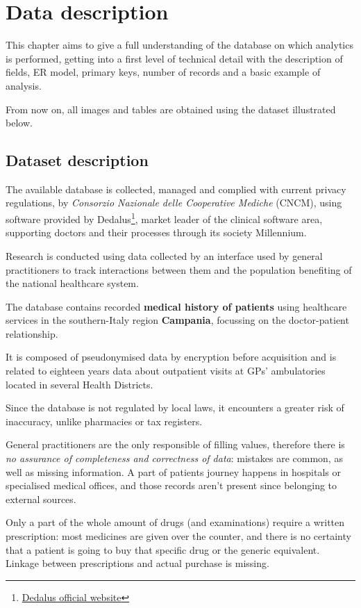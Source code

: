 \chapter{Data description}
This chapter aims to give a full understanding of the database on which analytics is performed, getting into a first level of technical detail with the description of fields, ER model, primary keys, number of records and a basic example of analysis.

From now on, all images and tables are obtained using the dataset illustrated below.

\section{Dataset description}
The available database is collected, managed and complied with current privacy regulations, by \textit{Consorzio Nazionale delle Cooperative Mediche} (CNCM), using software provided by Dedalus\footnote{\href{https://www.dedalus.eu/}{Dedalus official website}}, market leader of the clinical software area, supporting doctors and their processes through its society Millennium. 

Research is conducted using data collected by an interface used by general practitioners to track interactions between them and the population benefiting of the national healthcare system.

The database contains recorded \textbf{medical history of patients} using healthcare services in the southern-Italy region \textbf{Campania}, focussing on the doctor-patient relationship.

It is composed of pseudonymised data by encryption before acquisition and is related to eighteen years data about outpatient visits at GPs’ ambulatories located in several Health Districts.

Since the database is not regulated by local laws, it encounters a greater risk of inaccuracy, unlike pharmacies or tax registers. 

General practitioners are the only responsible of filling values, therefore there is \textit{no assurance of completeness and correctness of data}: mistakes are common, as well as missing information. A part of patients journey happens in hospitals or specialised medical offices, and those records aren't present since belonging to external sources.

Only a part of the whole amount of drugs (and examinations) require a written prescription: most medicines are given over the counter, and there is no certainty that a patient is going to buy that specific drug or the generic equivalent. Linkage between prescriptions and actual purchase is missing.

